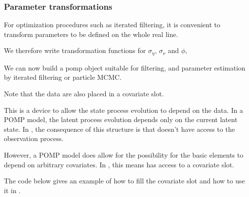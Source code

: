 \begin{frame}[fragile]

\frametitle{Parameter transformations}

\bi

\item For optimization procedures such as iterated filtering, it is convenient to transform parameters to be defined on the whole real line. 

\item We therefore write transformation functions for $\sigma_\eta$, $\sigma_\nu$ and $\phi$,

\ei

\begin{knitrout}\small
{}\color{fgcolor}\begin{kframe}
\begin{alltt}
 \hlkwb{<-} \hldef{(}
  \hldef{=}\hldef{(}\hldef{,}\hldef{),}
  \hldef{=}
\hldef{)}
\end{alltt}
\end{kframe}
\end{knitrout}

\end{frame}


\begin{frame}[fragile]

\bi

\item We can now build a pomp object suitable for filtering, and parameter estimation by iterated filtering or particle MCMC. 

\item Note that the data are also placed in a covariate slot. 

\item This is a device to allow the state process evolution to depend on the data. In a POMP model, the latent process evolution depends only on the current latent state. In , the consequence of this structure is that  doesn't have access to the observation process. 

\item However, a POMP model does allow for the possibility for the basic elements to depend on arbitrary covariates. In , this means  has access to a covariate slot.

\item The code below gives an example of how to fill the covariate slot and how to use it in .


\ei

\end{frame}

